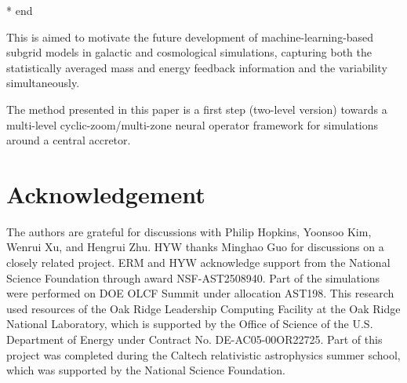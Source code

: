 \documentclass{article}
\newcommand{\hywcom}[1]{{\color{purple}{[HYW: #1]}}}
\begin{document}
* end

This is aimed to motivate the future development of machine-learning-based subgrid models in galactic and cosmological simulations, capturing both the statistically averaged mass and energy feedback information and the variability simultaneously.

\hywcom{Future Prospective.}
The method presented in this paper is a first step (two-level version) towards a multi-level cyclic-zoom/multi-zone neural operator framework for simulations around a central accretor.

\section{Acknowledgement}
The authors are grateful for discussions with Philip Hopkins, Yoonsoo Kim, Wenrui Xu, and Hengrui Zhu.
HYW thanks Minghao Guo for discussions on a closely related project.
ERM and HYW acknowledge support from the National Science Foundation through award NSF-AST2508940.
Part of the simulations were performed on DOE OLCF Summit under allocation AST198.
This research used resources of the Oak Ridge Leadership Computing Facility at the Oak Ridge National Laboratory, which is supported by the Office of Science of the U.S. Department of Energy under Contract No. DE-AC05-00OR22725. 
Part of this project was completed during the Caltech relativistic astrophysics summer school, which was supported by the National Science Foundation. 





\end{document}
